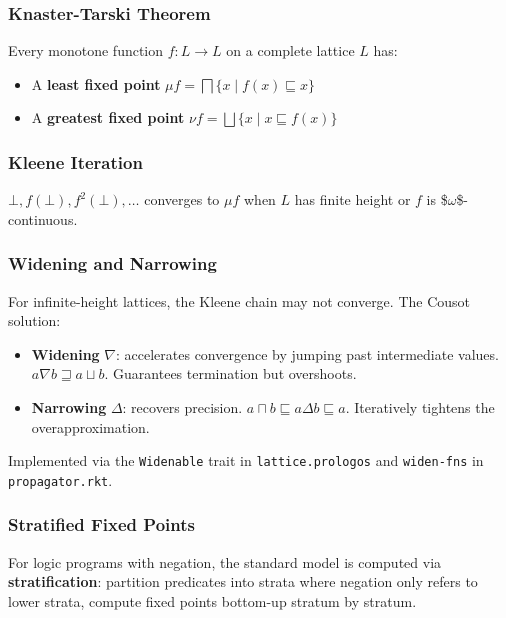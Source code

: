 \documentclass[11pt]{article}
\begin{document}
\subsubsection{Knaster-Tarski Theorem}
\label{sec:orgeab6399}

Every monotone function \(f : L \to L\) on a complete lattice \(L\) has:
\begin{itemize}
\item A \textbf{least fixed point} \(\mu f = \bigsqcap \{x \mid f(x) \sqsubseteq x\}\)
\item A \textbf{greatest fixed point} \(\nu f = \bigsqcup \{x \mid x \sqsubseteq f(x)\}\)
\end{itemize}
\subsubsection{Kleene Iteration}
\label{sec:org47d8ee9}

\(\bot, f(\bot), f^2(\bot), \ldots\) converges to \(\mu f\) when \(L\) has finite
height or \(f\) is \$\(\omega\)\$-continuous.
\subsubsection{Widening and Narrowing}
\label{sec:org8428eae}

For infinite-height lattices, the Kleene chain may not converge. The Cousot
solution:

\begin{itemize}
\item \textbf{Widening} \(\nabla\): accelerates convergence by jumping past intermediate
values. \(a \nabla b \sqsupseteq a \sqcup b\). Guarantees termination but
overshoots.
\item \textbf{Narrowing} \(\Delta\): recovers precision. \(a \sqcap b \sqsubseteq a \Delta b
  \sqsubseteq a\). Iteratively tightens the overapproximation.
\end{itemize}

Implemented via the \texttt{Widenable} trait in \texttt{lattice.prologos} and \texttt{widen-fns}
in \texttt{propagator.rkt}.
\subsubsection{Stratified Fixed Points}
\label{sec:org0fb3032}

For logic programs with negation, the standard model is computed via
\textbf{stratification}: partition predicates into strata where negation only refers to
lower strata, compute fixed points bottom-up stratum by stratum.
\end{document}
